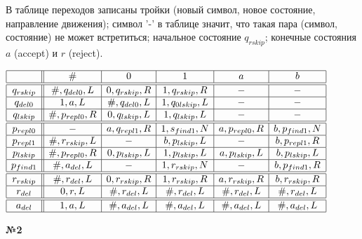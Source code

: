 \documentclass{article}
\newenvironment{task}{\begin{center}\fontsize{14}{14}\selectfont\bf}{\rm\fontsize{12}{12}\selectfont\end{center}}
\begin{document}
	В таблице переходов записаны тройки (новый символ, новое состояние, направление движения); символ '-' в таблице значит, что такая пара (символ, состояние) не может встретиться; начальное состояние $q_{rskip}$; конечные состояния $a$ (accept) и $r$ (reject). 
	\def\arraystretch{1.8}
	\fontsize{14}{14}
	\begin{center}
		$\begin{array}{|c||c|c|c|c|c|}
			\hline 
			\			& \# 				& 0 				& 1 				& a 				& b 				\\ \hline \hline
			q_{rskip} 	& \#, q_{del0}, L	& 0, q_{rskip}, R	& 1, q_{rskip}, R	&	- 				&  -				\\ \hline
			q_{del0} 	& 1, a, L 	 		& \#, q_{del0}, L	& 1, q_{0lskip}, L	&	- 				&  -				\\ \hline
			q_{lskip} 	& \#, p_{repl0}, R 	& 0, q_{lskip}, L	& 1, q_{lskip}, L	&	- 				&  -				\\ \hline \hline
			p_{repl0} 	& -				 	& a, q_{repl1}, R	& 1, s_{find1}, N	& a, p_{repl0}, R 	& b, p_{find1}, N 	\\ \hline
			p_{repl1} 	& \#, r_{rskip}, L 	& - 				& b, p_{lskip}, L	& -				 	& b, p_{repl1}, R 	\\ \hline
			p_{lskip} 	& \#, p_{repl0}, R 	& 0, p_{lskip}, L	& 1, p_{lskip}, L	& a, p_{lskip}, L 	& b, p_{lskip}, L 	\\ \hline
			p_{find1} 	& \#, a_{del}, L 	& -					& 1, r_{rskip}, N	& -				 	& b, p_{find1}, R 	\\ \hline \hline
			r_{rskip} 	& \#, r_{del}, L 	& 0, r_{rskip}, R	& 1, r_{rskip}, R	& a, r_{rskip}, R 	& b, r_{rskip}, R 	\\ \hline
			r_{del} 	& 0, r, L 			& \#, r_{del}, L	& \#, r_{del}, L	& \#, r_{del}, L 	& \#, r_{del}, L 	\\ \hline \hline
			a_{del} 	& 1, a, L 			& \#, a_{del}, L	& \#, a_{del}, L	& \#, a_{del}, L 	& \#, a_{del}, L 	\\ \hline
		\end{array}$
	\end{center}
	\fontsize{12}{12}
	
	\vfill
		
	\begin{task} 
		№2
	\end{task}
\end{document}
